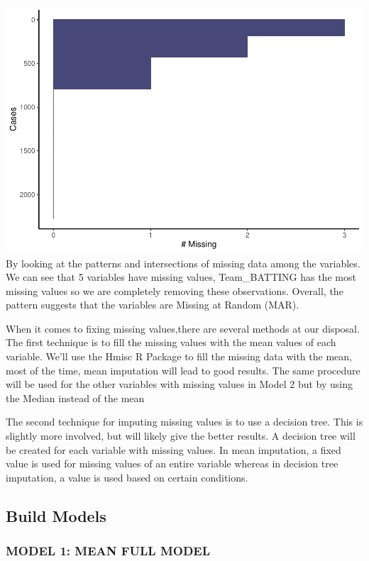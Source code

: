 \documentclass[
]{article}
\begin{document}
\includegraphics{Assignment1_files/figure-latex/unnamed-chunk-16-2.pdf}
By looking at the patterns and intersections of missing data among the
variables. We can see that 5 variables have missing values,
Team\_BATTING has the most missing values so we are completely removing
these observations. Overall, the pattern suggests that the variables are
Missing at Random (MAR).

When it comes to fixing missing values,there are several methods at our
disposal. The first technique is to fill the missing values with the
mean values of each variable. We'll use the Hmisc R Package to fill the
missing data with the mean, most of the time, mean imputation will lead
to good results. The same procedure will be used for the other variables
with missing values in Model 2 but by using the Median instead of the
mean

The second technique for imputing missing values is to use a decision
tree. This is slightly more involved, but will likely give the better
results. A decision tree will be created for each variable with missing
values. In mean imputation, a fixed value is used for missing values of
an entire variable whereas in decision tree imputation, a value is used
based on certain conditions.

\hypertarget{build-models}{%
\subsection{Build Models}\label{build-models}}

\hypertarget{model-1-mean-full-model}{%
\subsubsection{MODEL 1: MEAN FULL MODEL}\label{model-1-mean-full-model}}
\end{document}
